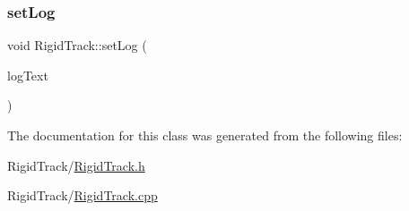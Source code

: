 \subsubsection{\texorpdfstring{set\+Log}{setLog}}
{\footnotesize\ttfamily void Rigid\+Track\+::set\+Log (\begin{DoxyParamCaption}\item[{Q\+String}]{log\+Text }\end{DoxyParamCaption})\hspace{0.3cm}{\ttfamily [slot]}}



The documentation for this class was generated from the following files\+:\begin{DoxyCompactItemize}
\item 
Rigid\+Track/\hyperlink{_rigid_track_8h}{Rigid\+Track.\+h}\item 
Rigid\+Track/\hyperlink{_rigid_track_8cpp}{Rigid\+Track.\+cpp}\end{DoxyCompactItemize}
